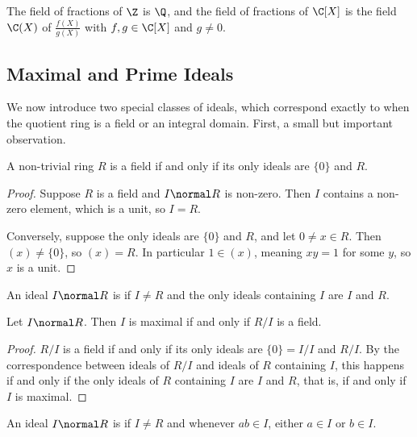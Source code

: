\begin{example}
	The field of fractions of $\Z$ is $\Q$, and the field of fractions of $\C[X]$ is the field $\C(X)$ of  $\frac{f(X)}{g(X)}$ with $f, g \in \C[X]$ and $g \neq 0$.
\end{example}

\subsection{Maximal and Prime Ideals}

We now introduce two special classes of ideals, which correspond exactly to when the quotient ring is a field or an integral domain. First, a small but important observation.

\begin{lemma}
	A non-trivial ring $R$ is a field if and only if its only ideals are $\{0\}$ and $R$.
\end{lemma}
\begin{proof}
	Suppose $R$ is a field and $I \normal R$ is non-zero. Then $I$ contains a non-zero element, which is a unit, so $I = R$.

	Conversely, suppose the only ideals are $\{0\}$ and $R$, and let $0 \neq x \in R$. Then $(x) \neq \{0\}$, so $(x) = R$. In particular $1 \in (x)$, meaning $xy = 1$ for some $y$, so $x$ is a unit.
\end{proof}

\begin{definition}
	An ideal $I \normal R$ is  if $I \neq R$ and the only ideals containing $I$ are $I$ and $R$.
\end{definition}

\begin{proposition}
	Let $I \normal R$. Then $I$ is maximal if and only if $R/I$ is a field.
\end{proposition}
\begin{proof}
	$R/I$ is a field if and only if its only ideals are $\{0\} = I/I$ and $R/I$. By the correspondence between ideals of $R/I$ and ideals of $R$ containing $I$, this happens if and only if the only ideals of $R$ containing $I$ are $I$ and $R$, that is, if and only if $I$ is maximal.
\end{proof}

\begin{definition}
	An ideal $I \normal R$ is  if $I \neq R$ and whenever $ab \in I$, either $a \in I$ or $b \in I$.
\end{definition}

